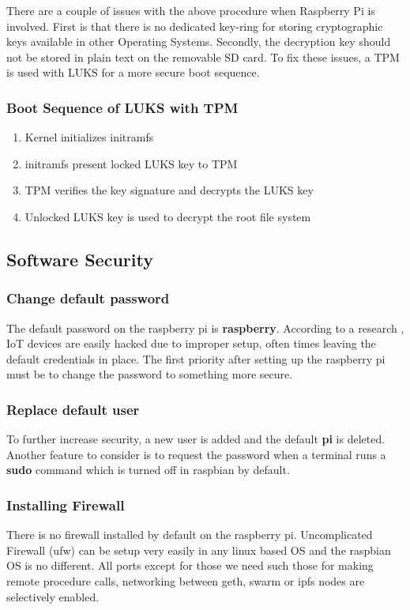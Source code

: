 \documentclass[11pt,openright]{report}
\begin{document}
There are a couple of issues with the above procedure when Raspberry Pi is involved. First is that there is no dedicated key-ring for storing cryptographic keys available in other Operating Systems. Secondly, the decryption key should not be stored in plain text on the removable SD card. To fix these issues, a TPM is used with LUKS for a more secure boot sequence.

\subsubsection{Boot Sequence of LUKS with TPM}
\begin{enumerate}
	\item Kernel initializes initramfs
	\item initramfs present locked LUKS key to TPM
	\item TPM verifies the key signature and decrypts the LUKS key
	\item Unlocked LUKS key is used to decrypt the root file system
\end{enumerate}

\subsection{Software Security}
\subsubsection{Change default password}
The default password on the raspberry pi is \textbf{raspberry}. According to a research \cite{8364059}, IoT devices are easily hacked due to improper setup, often times leaving the default credentials in place. The first priority after setting up the raspberry pi must be to change the password to something more secure.

\subsubsection{Replace default user}
To further increase security, a new user is added and the default \textbf{pi} is deleted. Another feature to consider is to request the password when a terminal runs a \textbf{sudo} command which is turned off in raspbian by default.

\subsubsection{Installing Firewall}
There is no firewall installed by default on the raspberry pi. Uncomplicated Firewall (ufw) can be setup very easily in any linux based OS and the raspbian OS is no different. All ports except for those we need such those for making remote procedure calls, networking between geth, swarm or ipfs nodes are selectively enabled.
\end{document}
